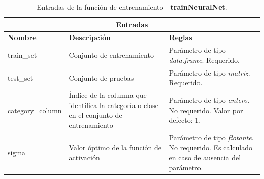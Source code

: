 \begin{table}[htb]
\begin{center}
\begin{tabular}{|p{3cm}|p{5cm}|p{8cm}|}
\hline
\multicolumn{3}{|c|}{\textbf{Entradas}} \\
\hline
\textbf{Nombre} & \textbf{Descripción} & \textbf{Reglas} \\
\hline \hline
train\_set & Conjunto de entrenamiento & Parámetro de tipo \textit{data.frame}. Requerido. \\ \hline
test\_set & Conjunto de pruebas & Parámetro de tipo \textit{matriz}. Requerido. \\ \hline
category\_column & Índice de la columna que identifica la categoría o clase en el conjunto de entrenamiento & Parámetro de tipo \textit{entero}. No requerido. Valor por defecto: 1. \\ \hline
sigma & Valor óptimo de la función de activación & Parámetro de tipo \textit{flotante}. No requerido. Es calculado en caso de ausencia del parámetro. \\ \hline
\end{tabular}
\caption{Entradas de la función de entrenamiento - \textbf{trainNeuralNet}.}
\label{tabla:entradasTrainNeuralNet}
\end{center}
\end{table}

